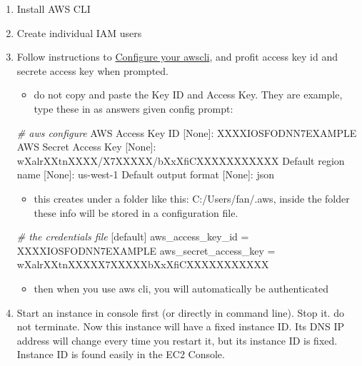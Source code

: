 \documentclass[
]{book}
\newenvironment{Shaded}{\begin{snugshade}}{\end{snugshade}}
\newcommand{\CommentTok}[1]{\textcolor[rgb]{0.56,0.35,0.01}{\textit{#1}}}
\newcommand{\ExtensionTok}[1]{#1}
\newcommand{\NormalTok}[1]{#1}
\providecommand{\tightlist}{%
  \setlength{\itemsep}{0pt}\setlength{\parskip}{0pt}}
\begin{document}
\begin{enumerate}
\def\labelenumi{\arabic{enumi}.}
\tightlist
\item
  Install AWS CLI
\item
  Create individual IAM users
\item
  Follow instructions to \href{https://docs.aws.amazon.com/cli/latest/userguide/cli-chap-getting-started.html}{Configure your awscli}, and profit access key id and secrete access key when prompted.

  \begin{itemize}
  \tightlist
  \item
    do not copy and paste the Key ID and Access Key. They are example, type these in as answers given config prompt:
  \end{itemize}

\begin{Shaded}
\begin{Highlighting}[]
\CommentTok{# aws configure}
\ExtensionTok{AWS}\NormalTok{ Access Key ID [None]: XXXXIOSFODNN7EXAMPLE}
\ExtensionTok{AWS}\NormalTok{ Secret Access Key [None]: wXalrXXtnXXXX/X7XXXXX/bXxXfiCXXXXXXXXXXX}
\ExtensionTok{Default}\NormalTok{ region name [None]: us-west-1}
\ExtensionTok{Default}\NormalTok{ output format [None]: json}
\end{Highlighting}
\end{Shaded}

  \begin{itemize}
  \tightlist
  \item
    this creates under a folder like this: C:/Users/fan/.aws, inside the folder these info will be stored in a configuration file.
  \end{itemize}

\begin{Shaded}
\begin{Highlighting}[]
\CommentTok{# the credentials file}
\NormalTok{[}\ExtensionTok{default}\NormalTok{]}
\ExtensionTok{aws_access_key_id}\NormalTok{ = XXXXIOSFODNN7EXAMPLE}
\ExtensionTok{aws_secret_access_key}\NormalTok{ = wXalrXXtnXXXXX7XXXXXbXxXfiCXXXXXXXXXXX}
\end{Highlighting}
\end{Shaded}

  \begin{itemize}
  \tightlist
  \item
    then when you use aws cli, you will automatically be authenticated
  \end{itemize}
\item
  Start an instance in console first (or directly in command line). Stop it. do not terminate. Now this instance will have a fixed instance ID. Its DNS IP address will change every time you restart it, but its instance ID is fixed. Instance ID is found easily in the EC2 Console.


\end{enumerate}
\end{document}
